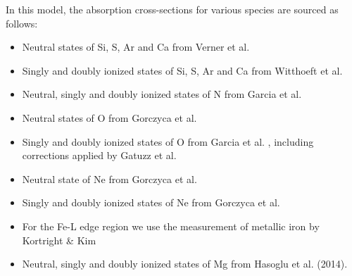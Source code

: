			In this model, the absorption cross-sections for various species are sourced as follows:
			\begin{itemize}
				\item Neutral states of Si, S, Ar and Ca from Verner et al. \cite{vernerXS}
				\item Singly and doubly ionized states of Si, S, Ar and Ca from Witthoeft et al. \cite{witthoeftXS1,witthoeftXS2}
				\item Neutral, singly and doubly ionized states of N from Garcia et al. \cite{garciaXS1}
				\item Neutral states of O from Gorczyca et al. \cite{gorczycaXS1}
				\item Singly and doubly ionized states of O from Garcia et al. \cite{garciaXS2}, including corrections applied by Gatuzz et al. \cite{gatuzzXS}
				\item Neutral state of Ne from Gorczyca et al. \cite{gorczycaXS2}
				\item Singly and doubly ionized states of Ne from Gorczyca et al. \cite{gorczycaXS3}
				\item For the Fe-L edge region we use the measurement of metallic iron by Kortright \& Kim \cite{kortrightXS}
				\item Neutral, singly and doubly ionized states of Mg from Hasoglu et al. (2014).
			\end{itemize}
			
